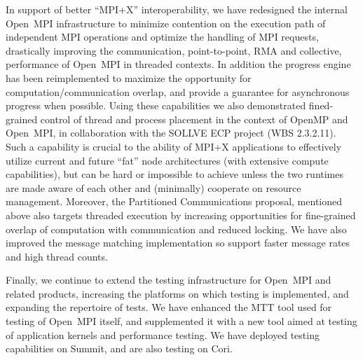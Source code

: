 In support of better ``MPI+X'' interoperability, we have redesigned the internal Open~MPI infrastructure to minimize contention on the execution path of independent MPI operations and optimize the handling of MPI requests, drastically improving the communication, point-to-point, RMA and collective, performance of Open~MPI in threaded contexts. In addition the progress engine has been reimplemented to maximize the opportunity for computation/communication overlap, and provide a guarantee for asynchronous progress when possible. Using these capabilities we also demonstrated fined-grained control of thread and process placement in the context of OpenMP and Open~MPI, in collaboration with the SOLLVE ECP project (WBS 2.3.2.11). Such a capability is crucial to the ability of MPI+X applications to effectively utilize current and future ``fat'' node architectures (with extensive compute capabilities), but can be hard or impossible to achieve unless the two runtimes are made aware of each other and (minimally) cooperate on resource management.
%
Moreover, the Partitioned Communications proposal, mentioned above also targets threaded execution by increasing opportunities for fine-grained overlap of computation with communication and reduced locking.  We have also improved the message matching implementation so support faster message rates and high thread counts.

Finally, we continue to extend the testing infrastructure for Open~MPI and related products, increasing the platforms on which testing is implemented, and expanding the repertoire of tests.  We have enhanced the MTT tool used for testing of Open~MPI itself, and supplemented it with a new tool aimed at testing of application kernels and performance testing.  We have deployed testing capabilities on Summit, and are also testing on Cori.


